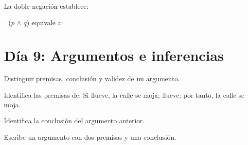 \begin{activity}[id=dia-08-opcion-01,type=choice,weight=1]

La doble negación establece:





\end{activity}

\begin{activity}[id=dia-08-opcion-02,type=choice,weight=1]

\(\neg\)(\(p\) \(\land\) \(q\)) equivale a:




\end{activity}

\section{Día 9: Argumentos e inferencias}

\begin{lesson}[id=dia-09-lectura,weight=0]

Distinguir premisas, conclusión y validez de un argumento.

\end{lesson}

\begin{activity}[id=dia-09-corta-01,type=short,weight=1]

Identifica las premisas de: Si llueve, la calle se moja; llueve; por tanto, la calle se moja.

\end{activity}

\begin{activity}[id=dia-09-corta-02,type=short,weight=1]

Identifica la conclusión del argumento anterior.

\end{activity}

\begin{activity}[id=dia-09-corta-03,type=short,weight=1]

Escribe un argumento con dos premisas y una conclusión.

\end{activity}

